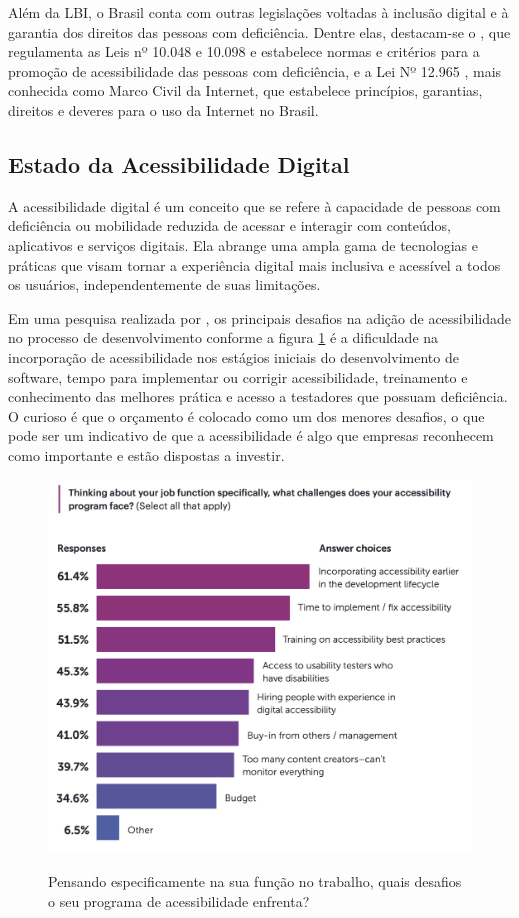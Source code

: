 Além da LBI, o Brasil conta com outras legislações voltadas à inclusão digital e à garantia dos direitos das pessoas com deficiência. Dentre elas, destacam-se o \cite{decreto5296}, que regulamenta as Leis nº 10.048 e 10.098 e estabelece normas e critérios para a promoção de acessibilidade das pessoas com deficiência, e a Lei Nº 12.965 \cite{lei12965}, mais conhecida como Marco Civil da Internet, que estabelece princípios, garantias, direitos e deveres para o uso da Internet no Brasil.

\subsection{Estado da Acessibilidade Digital}

A acessibilidade digital é um conceito que se refere à capacidade de pessoas com deficiência ou mobilidade reduzida de acessar e interagir com conteúdos, aplicativos e serviços digitais. Ela abrange uma ampla gama de tecnologias e práticas que visam tornar a experiência digital mais inclusiva e acessível a todos os usuários, independentemente de suas limitações.

Em uma pesquisa realizada por \cite{iaap}, os principais desafios na adição de acessibilidade no processo de desenvolvimento conforme a figura \ref{fig:desafios-acessibilidade-iaap} é a dificuldade na incorporação de acessibilidade nos estágios iniciais do desenvolvimento de software, tempo para implementar ou corrigir acessibilidade, treinamento e conhecimento das melhores prática e acesso a testadores que possuam deficiência. O curioso é que o orçamento é colocado como um dos menores desafios, o que pode ser um indicativo de que a acessibilidade é algo que empresas reconhecem como importante e estão dispostas a investir.

\begin{figure}[!ht]
	\centering
	\caption{Pensando especificamente na sua função no trabalho, quais desafios o seu programa de acessibilidade enfrenta?}
	\includegraphics[width=350pt]{Assets/IAAPDesafios.png}
	\label{fig:desafios-acessibilidade-iaap}
\end{figure}


